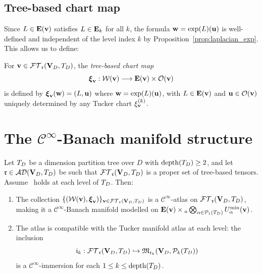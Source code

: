 \subsection*{Tree-based chart map}

Since $L \in \mathbf{E}(\mathbf{v})$ satisfies $L \in \mathbf{E}_{k}$ for all
$k$, the formula $\mathbf{w} = \exp(L)(\mathbf{u})$ is well-defined and independent
of the level index $k$ by Proposition~\ref{prop:laplacian_exp}.
This allows us to define:

\begin{definition}
\label{def:TBT_chart}
For $\mathbf{v} \in \mathcal{FT}_{\mathfrak{r}}(\mathbf{V}_D,T_D)$, the \emph{tree-based chart map}
\begin{equation}
\label{eq:TBT_chart_map}
    \boldsymbol{\xi}_{\mathbf{v}} : \mathcal{W}(\mathbf{v})
    \longrightarrow \mathbf{E}(\mathbf{v}) \times \mathcal{O}(\mathbf{v})
\end{equation}
is defined by $\boldsymbol{\xi}_{\mathbf{v}}(\mathbf{w}) = (L, \mathbf{u})$ where
$\mathbf{w} = \exp(L)(\mathbf{u})$, with $L \in \mathbf{E}(\mathbf{v})$ and
$\mathbf{u} \in \mathcal{O}(\mathbf{v})$ uniquely determined by any Tucker chart
$\xi_{\mathbf{v}}^{(k)}$.
\end{definition}

\section{The $\mathcal{C}^\infty$-Banach manifold structure}
\label{sec:TB_manifold:cinfty}

\begin{theorem}
\label{thm:TBT_Banach_Manifold}
Let $T_D$ be a dimension partition tree over $D$ with $\mathrm{depth}(T_D) \geq 2$,
and let $\mathfrak{r} \in \mathcal{AD}(\mathbf{V}_D,T_D)$ be such that $\mathcal{FT}_{\mathfrak{r}}(\mathbf{V}_D,T_D)$ is a proper set of
tree-based tensors. Assume \condINJ\ holds at each level of $T_D$.
Then:
\begin{enumerate}
\item[\textup{(i)}] The collection
    $\{(\mathcal{W}(\mathbf{v}), \boldsymbol{\xi}_{\mathbf{v}})\}_{\mathbf{v} \in \mathcal{FT}_{\mathfrak{r}}(\mathbf{V}_D,T_D)}$
    is a $\mathcal{C}^\infty$-atlas on $\mathcal{FT}_{\mathfrak{r}}(\mathbf{V}_D,T_D)$, making it a
    $\mathcal{C}^\infty$-Banach manifold modelled on
    $\mathbf{E}(\mathbf{v}) \times {}_a\bigotimes_{\alpha \in \mathcal{P}_{1}(T_D)}
    U^{\min}_{\alpha}(\mathbf{v})$.

\item[\textup{(ii)}] The atlas is compatible with the Tucker manifold
    atlas at each level: the inclusion
    \begin{equation*}
        \mathfrak{i}_k : \mathcal{FT}_{\mathfrak{r}}(\mathbf{V}_D,T_D) \hookrightarrow
        \mathfrak{M}_{\mathfrak{r}_k}(\mathbf{V}_D, \mathcal{P}_{k}(T_D))
    \end{equation*}
    is a $\mathcal{C}^\infty$-immersion for each $1 \leq k \leq \mathrm{depth}(T_D)$.
\end{enumerate}
\end{theorem}

